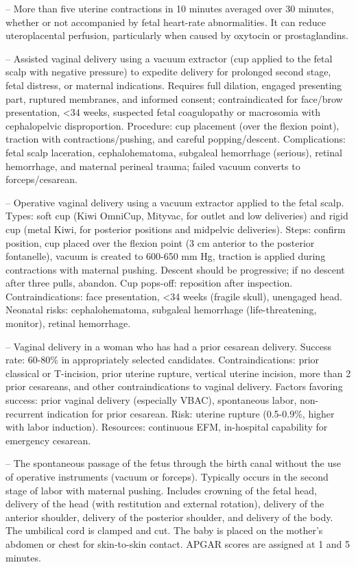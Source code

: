 -- More than five uterine contractions in 10 minutes averaged over 30 minutes, whether or not accompanied by fetal heart-rate abnormalities. It can reduce uteroplacental perfusion, particularly when caused by oxytocin or prostaglandins.

-- Assisted vaginal delivery using a vacuum extractor (cup applied to the fetal scalp with negative pressure) to expedite delivery for prolonged second stage, fetal distress, or maternal indications. Requires full dilation, engaged presenting part, ruptured membranes, and informed consent; contraindicated for face/brow presentation, <34 weeks, suspected fetal coagulopathy or macrosomia with cephalopelvic disproportion. Procedure: cup placement (over the flexion point), traction with contractions/pushing, and careful popping/descent. Complications: fetal scalp laceration, cephalohematoma, subgaleal hemorrhage (serious), retinal hemorrhage, and maternal perineal trauma; failed vacuum converts to forceps/cesarean.

-- Operative vaginal delivery using a vacuum extractor applied to the fetal scalp. Types: soft cup (Kiwi OmniCup, Mityvac, for outlet and low deliveries) and rigid cup (metal Kiwi, for posterior positions and midpelvic deliveries). Steps: confirm position, cup placed over the flexion point (3 cm anterior to the posterior fontanelle), vacuum is created to 600-650 mm Hg, traction is applied during contractions with maternal pushing. Descent should be progressive; if no descent after three pulls, abandon. Cup pops-off: reposition after inspection. Contraindications: face presentation, <34 weeks (fragile skull), unengaged head. Neonatal risks: cephalohematoma, subgaleal hemorrhage (life-threatening, monitor), retinal hemorrhage.

-- Vaginal delivery in a woman who has had a prior cesarean delivery. Success rate: 60-80\% in appropriately selected candidates. Contraindications: prior classical or T-incision, prior uterine rupture, vertical uterine incision, more than 2 prior cesareans, and other contraindications to vaginal delivery. Factors favoring success: prior vaginal delivery (especially VBAC), spontaneous labor, non-recurrent indication for prior cesarean. Risk: uterine rupture (0.5-0.9\%, higher with labor induction). Resources: continuous EFM, in-hospital capability for emergency cesarean.

-- The spontaneous passage of the fetus through the birth canal without the use of operative instruments (vacuum or forceps). Typically occurs in the second stage of labor with maternal pushing. Includes crowning of the fetal head, delivery of the head (with restitution and external rotation), delivery of the anterior shoulder, delivery of the posterior shoulder, and delivery of the body. The umbilical cord is clamped and cut. The baby is placed on the mother's abdomen or chest for skin-to-skin contact. APGAR scores are assigned at 1 and 5 minutes.

